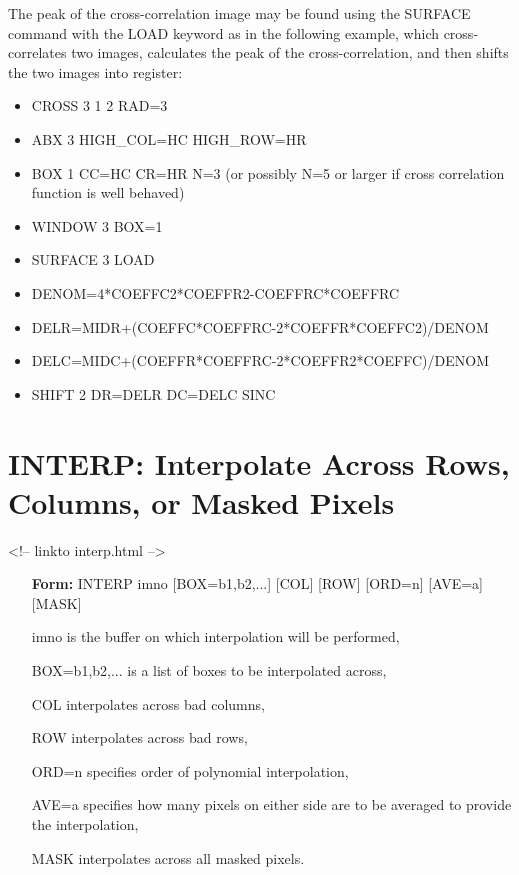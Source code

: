 The peak of the cross-correlation image may be found using the SURFACE
command with the LOAD keyword as in the following example, which
cross-correlates two images, calculates the peak of the cross-correlation,
and then shifts the two images into register:
\begin{itemize}
  \item{CROSS 3 1 2 RAD=3}
  \item{ABX 3 HIGH\_COL=HC HIGH\_ROW=HR}
  \item{BOX 1 CC=HC CR=HR N=3  (or possibly N=5 or larger if cross correlation
             function is well behaved)}
  \item{WINDOW 3 BOX=1}
  \item{SURFACE 3 LOAD}
  \item{DENOM=4*COEFFC2*COEFFR2-COEFFRC*COEFFRC}
  \item{DELR=MIDR+(COEFFC*COEFFRC-2*COEFFR*COEFFC2)/DENOM}
  \item{DELC=MIDC+(COEFFR*COEFFRC-2*COEFFR2*COEFFC)/DENOM}
  \item{SHIFT 2 DR=DELR DC=DELC SINC}
\end{itemize}

\section{INTERP: Interpolate Across Rows, Columns, or Masked Pixels}
\begin{rawhtml}
<!-- linkto interp.html -->
\end{rawhtml}

\begin{itemize}
  \item[\textbf{Form: }INTERP imno {[BOX=b1,b2,...]} {[COL]} {[ROW]} {[ORD=n]} {[AVE=a]} {[MASK]}\hfill]{}
  \item[imno]{is the buffer on which interpolation will be performed,}
  \item[BOX=b1,b2,...]{is a list of boxes to be interpolated across,}
  \item[COL]{interpolates across bad columns,}
  \item[ROW]{interpolates across bad rows,}
  \item[ORD=n]{specifies order of polynomial interpolation,}
  \item[AVE=a]{specifies how many pixels on either side are to be averaged 
       to provide the interpolation,}
  \item[MASK]{interpolates across all masked pixels.}
\end{itemize}


